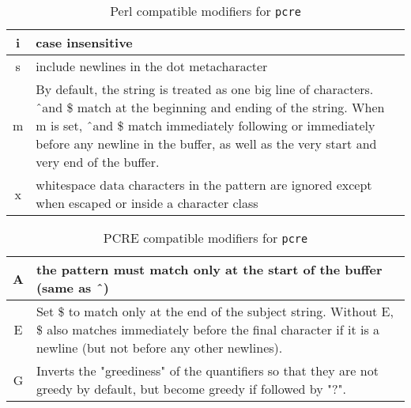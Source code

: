 \documentclass[english]{report}
\begin{document}
\begin{table}[ht]
\begin{center}
\caption{Perl compatible modifiers for \texttt{pcre}}
\label{pcre-mod_perl}
\begin{tabular}{|c|p{4.5in}|}

\hline
i & case insensitive \\

\hline
s & include newlines in the dot metacharacter \\

\hline
m &

By default, the string is treated as one big line of characters.  \^\ and \$
match at the beginning and ending of the string. When m is set, \^\ and \$
match immediately following or immediately before any newline in the buffer, as
well as the very start and very end of the buffer. \\

\hline
x &

whitespace  data characters in the pattern are ignored except when escaped or
inside a character class \\

\hline
\end{tabular}
\end{center}
\end{table}

\begin{table}[ht]
\begin{center}
\caption{PCRE compatible modifiers for \texttt{pcre}}
\label{pcre-mod_pcre}
\begin{tabular}{|c|p{4.5in}|}

\hline
A &

the pattern must match only at the start of the buffer (same as \^\ ) \\

\hline
E &

Set \$ to match only at the end of the subject string.  Without E, \$ also
matches immediately before the final character if it is a newline (but not
before any other newlines). \\

\hline
G &

Inverts the "greediness" of the quantifiers so that they are not greedy by
default, but become greedy if followed by "?". \\

\hline
\end{tabular}
\end{center}
\end{table}
\end{document}
